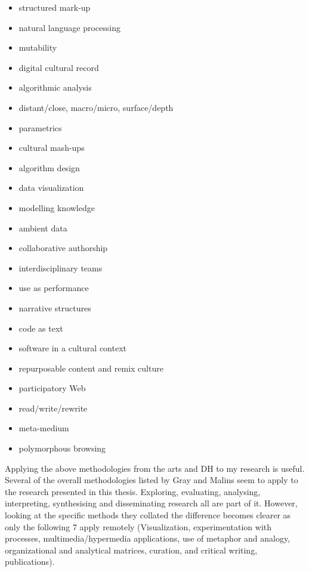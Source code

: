 \begin{multicols}{2}\raggedright
\begin{itemize}
  \item structured mark-up
  \item	natural language processing
  \item	mutability
  \item	digital cultural record
  \item	algorithmic analysis
  \item distant/close, macro/micro, surface/depth
  \item parametrics
  \item	cultural mash-ups
  \item	algorithm design
  \item data visualization
  \item	modelling knowledge
  \item	ambient data
  \item	collaborative authorship
  \item	interdisciplinary teams
  \item	use as performance
  \item narrative structures
  \item	code as text
  \item	software in a cultural context
  \item repurposable content and remix culture
  \item participatory Web
  \item	read/write/rewrite
  \item	meta-medium
  \item	polymorphous browsing
\end{itemize}
\end{multicols}

\spirals

Applying the above methodologies from the arts and \ac{DH} to my research is useful. Several of the overall methodologies listed by Gray and Malins \autocite*{Gray2004} seem to apply to the research presented in this thesis. Exploring, evaluating, analysing, interpreting, synthesising and disseminating research all are part of it. However, looking at the specific methods they collated the difference becomes clearer as only the following 7 apply remotely (Visualization, experimentation with processes, multimedia/hypermedia applications, use of metaphor and analogy, organizational and analytical matrices, curation, and critical writing, publications).

